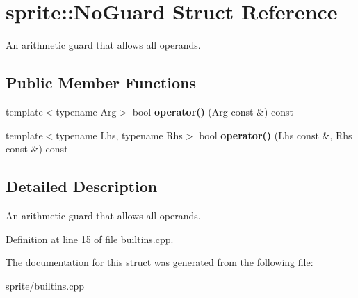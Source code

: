 \section{sprite::No\-Guard Struct Reference}
\label{structsprite_1_1NoGuard}
An arithmetic guard that allows all operands.  


\subsection*{Public Member Functions}
\begin{CompactItemize}
\item 
template$<$typename Arg$>$ bool {\bf operator()} (Arg const \&) const \label{structsprite_1_1NoGuard_a1}

\item 
template$<$typename Lhs, typename Rhs$>$ bool {\bf operator()} (Lhs const \&, Rhs const \&) const \label{structsprite_1_1NoGuard_a2}

\end{CompactItemize}


\subsection{Detailed Description}
An arithmetic guard that allows all operands. 



Definition at line 15 of file builtins.cpp.

The documentation for this struct was generated from the following file:\begin{CompactItemize}
\item 
sprite/builtins.cpp\end{CompactItemize}
